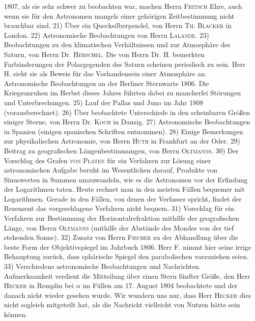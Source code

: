 1807, als sie sehr schwer zu beobachten war, machen Herrn \textsc{Fritsch} Ehre, auch wenn sie für den Astronomen mangels einer gehörigen Zeitbestimmung nicht brauchbar sind. 21) Über ein Quecksilberpendel, von Herrn \textsc{Th. Blacker} in London. 22) Astronomische Beobachtungen von Herrn \textsc{Lalande}. 23) Beobachtungen zu den klimatischen Verhältnissen und zur Atmosphäre des Saturn, von Herrn Dr. \textsc{Herschel}. Die von Herrn Dr. H. bemerkten Farbänderungen der Polargegenden des Saturn scheinen periodisch zu sein. Herr H. sieht sie als Beweis für das Vorhandensein einer Atmosphäre an. Astronomische Beobachtungen an der Berliner Sternwarte 1806. Die Kriegsunruhen im Herbst dieses Jahres führten dabei zu mancherlei Störungen und Unterbrechungen. 25) Lauf der Pallas und Juno im Jahr 1808 (vorausberechnet). 26) Über beobachtete Unterschiede in den scheinbaren Größen einiger Sterne, von Herrn Dr. \textsc{Koch} in Danzig. 27) Astronomische Beobachtungen in Spanien (einigen spanischen Schriften entnommen). 28) Einige Bemerkungen zur physikalischen Astronomie, von Herrn \textsc{Huth} in Frankfurt an der Oder. 29) Beitrag zu geografischen Längenbestimmungen, von Herrn \textsc{Oltmanns}. 30) Der Vorschlag des Grafen \textsc{von Platen} für ein Verfahren zur Lösung einer astronomischen Aufgabe beruht im Wesentlichen darauf, Produkte von Sinuswerten in Summen umzuwandeln, wie es die Astronomen vor der Erfindung der Logarithmen taten. Heute rechnet man in den meisten Fällen bequemer mit Logarithmen. Gerade in den Fällen, von denen der Verfasser spricht, findet der Rezensent das vorgeschlagene Verfahren nicht bequem. 31) Vorschlag für ein Verfahren zur Bestimmung der Horizontalrefraktion mithilfe der geografischen Länge, von Herrn \textsc{Oltmanns} (mithilfe der Abstände des Mondes von der tief stehenden Sonne). 32) Zusatz von Herrn \textsc{Fischer} zu der Abhandlung über die beste Form der Objektivspiegel im Jahrbuch 1806. Herr F. nimmt hier seine irrige Behauptung zurück, dass sphärische Spiegel den parabolischen vorzuziehen seien. 33) Verschiedene astronomische Beobachtungen und Nachrichten. Aufmerksamkeit verdient die Mitteilung über einen Stern fünfter Größe, den Herr \textsc{Hecker} in Remplin bei $\alpha$ im Füllen am 17. August 1804 beobachtete und der danach nicht wieder gesehen wurde. Wir wundern uns nur, dass Herr \textsc{Hecker} dies nicht sogleich mitgeteilt hat, als die Nachricht vielleicht von Nutzen hätte sein können.
